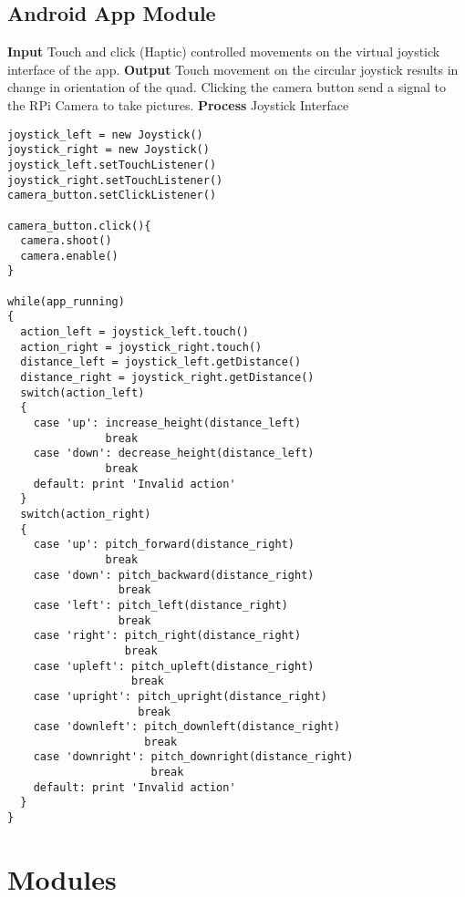 \subsection{Android App Module}
\textbf{Input}\newline
Touch and click (Haptic) controlled movements on the virtual joystick interface of the app. \newline
\textbf{Output}\newline
Touch movement on the circular joystick results in change in orientation of the quad.
Clicking the camera button send a signal to the RPi Camera to take pictures.
\newline
\textbf{Process}\newline
Joystick Interface
\begin{lstlisting}
joystick_left = new Joystick()
joystick_right = new Joystick()
joystick_left.setTouchListener()
joystick_right.setTouchListener()
camera_button.setClickListener()

camera_button.click(){
  camera.shoot()
  camera.enable()
}

while(app_running)
{
  action_left = joystick_left.touch()
  action_right = joystick_right.touch()
  distance_left = joystick_left.getDistance()
  distance_right = joystick_right.getDistance()
  switch(action_left)
  {
    case 'up': increase_height(distance_left)
               break
    case 'down': decrease_height(distance_left)
               break
    default: print 'Invalid action'
  }
  switch(action_right)
  {
    case 'up': pitch_forward(distance_right)
               break
    case 'down': pitch_backward(distance_right)
                 break
    case 'left': pitch_left(distance_right)
                 break
    case 'right': pitch_right(distance_right)
                  break
    case 'upleft': pitch_upleft(distance_right)
                   break
    case 'upright': pitch_upright(distance_right)
                    break
    case 'downleft': pitch_downleft(distance_right)
                     break
    case 'downright': pitch_downright(distance_right)
                      break
    default: print 'Invalid action'
  }
}
\end{lstlisting}


\section{Modules}
